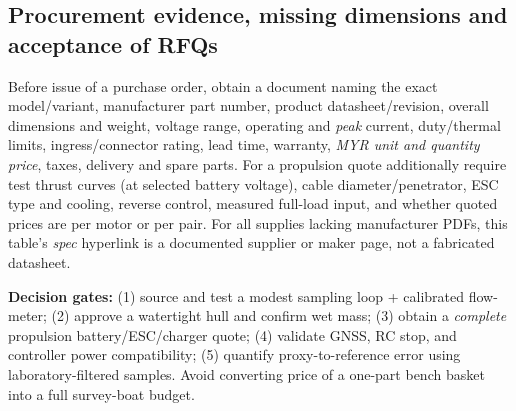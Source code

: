\documentclass[10pt,a4paper]{article}
\begin{document}
\subsection{Procurement evidence, missing dimensions and acceptance of RFQs}
Before issue of a purchase order, obtain a document naming the exact model/variant, manufacturer part number, product datasheet/revision, overall dimensions and weight, voltage range, operating and \emph{peak} current, duty/thermal limits, ingress/connector rating, lead time, warranty, \emph{MYR unit and quantity price}, taxes, delivery and spare parts. For a propulsion quote additionally require test thrust curves (at selected battery voltage), cable diameter/penetrator, ESC type and cooling, reverse control, measured full-load input, and whether quoted prices are per motor or per pair. For all supplies lacking manufacturer PDFs, this table's \emph{spec} hyperlink is a documented supplier or maker page, not a fabricated datasheet.

\textbf{Decision gates:} (1) source and test a modest sampling loop + calibrated flow-meter; (2) approve a watertight hull and confirm wet mass; (3) obtain a \emph{complete} propulsion battery/ESC/charger quote; (4) validate GNSS, RC stop, and controller power compatibility; (5) quantify proxy-to-reference error using laboratory-filtered samples. Avoid converting price of a one-part bench basket into a full survey-boat budget.
\end{document}
